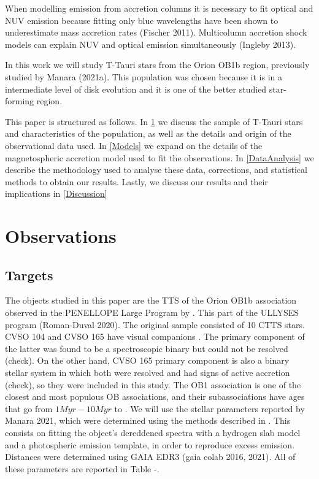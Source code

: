 \documentclass[twocolumn,linenumbers]{aastex631}
\begin{document}
When modelling emission from accretion columns it is necessary to fit optical and NUV emission because fitting only blue wavelengths have been shown to underestimate mass accretion rates (Fischer 2011). Multicolumn accretion shock models can explain NUV and optical emission simultaneously (Ingleby 2013).


In this work we will study T-Tauri stars from the Orion OB1b region, previously studied by Manara (2021a). This population was chosen because it is in a intermediate level of disk evolution and it is one of the better studied star-forming region. 

This paper is structured as follows. In \ref{Sample and observations} we discuss the sample of T-Tauri stars and characteristics of the population, as well as the details and origin of the observational data used. In \ref{Models} we expand on the details of the magnetospheric accretion model used to fit the observations. In \ref{DataAnalysis} we describe the methodology used to analyse these data, corrections, and statistical methods to obtain our results. Lastly, we discuss our results and their implications in \ref{Discussion}



\section{Observations} \label{Sample and observations}

\subsection{Targets}
The objects studied in this paper are the TTS of the Orion OB1b association observed in the PENELLOPE Large Program by \citep{manara2021}. This part of the ULLYSES program (Roman-Duval 2020). The original sample consisted of 10 CTTS stars. CVSO 104 and CVSO 165 have visual companions \citep{manara2021a}. The primary component of the latter was found to be a spectroscopic binary but could not be resolved (check). On the other hand, CVSO 165 primary component is also a binary stellar system in which both were resolved and had signs of active accretion (check), so they were included in this study. The OB1 association is one of the closest and most populous OB associations, and their subassociations have ages that go from $1Myr-10Myr$ to \citep{blaauw1994}.  We will use the stellar parameters reported by Manara 2021, which were determined using the methods described in \citep{manara2013a}. This consists on fitting the object's dereddened spectra with a hydrogen slab model and a photospheric emission template, in order to reproduce excess emission. Distances were determined using GAIA EDR3 (gaia colab 2016, 2021). All of these parameters are reported in Table -. 
\end{document}
